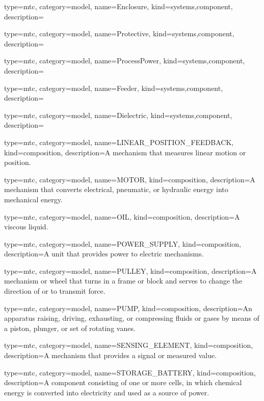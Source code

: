 {
  type=mtc,
  category=model,
  name={Enclosure},
  kind={systems,component},
  description={}
}


{
  type=mtc,
  category=model,
  name={Protective},
  kind={systems,component},
  description={}
}


{
  type=mtc,
  category=model,
  name={ProcessPower},
  kind={systems,component},
  description={}
}


{
  type=mtc,
  category=model,
  name={Feeder},
  kind={systems,component},
  description={}
}


{
  type=mtc,
  category=model,
  name={Dielectric},
  kind={systems,component},
  description={}
}


{
  type=mtc,
  category=model,
  name={LINEAR\_POSITION\_FEEDBACK},
  kind={composition},
  description={A mechanism that measures linear motion or position.}
}


{
  type=mtc,
  category=model,
  name={MOTOR},
  kind={composition},
  description={A mechanism that converts electrical, pneumatic, or hydraulic energy into mechanical energy.}
}


{
  type=mtc,
  category=model,
  name={OIL},
  kind={composition},
  description={A viscous liquid.}
}


{
  type=mtc,
  category=model,
  name={POWER\_SUPPLY},
  kind={composition},
  description={A unit that provides power to electric mechanisms.}
}


{
  type=mtc,
  category=model,
  name={PULLEY},
  kind={composition},
  description={A mechanism or wheel that turns in a frame or block and serves to change the direction of or to transmit force.}
}


{
  type=mtc,
  category=model,
  name={PUMP},
  kind={composition},
  description={An apparatus raising, driving, exhausting, or compressing fluids or gases by means of a piston, plunger, or set of rotating vanes.}
}


{
  type=mtc,
  category=model,
  name={SENSING\_ELEMENT},
  kind={composition},
  description={A mechanism that provides a signal or measured value.}
}


{
  type=mtc,
  category=model,
  name={STORAGE\_BATTERY},
  kind={composition},
  description={A component consisting of one or more cells, in which chemical energy is converted into electricity and used as a source of power. }
}


